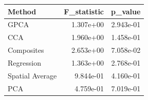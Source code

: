 \begin{tabular}{lrr}
\toprule
Method & F_statistic & p_value \\
\midrule
GPCA & 1.307e+00 & 2.943e-01 \\
CCA & 1.960e+00 & 1.458e-01 \\
Composites & 2.653e+00 & 7.058e-02 \\
Regression & 1.363e+00 & 2.768e-01 \\
Spatial Average & 9.844e-01 & 4.160e-01 \\
PCA & 4.759e-01 & 7.019e-01 \\
\bottomrule
\end{tabular}
